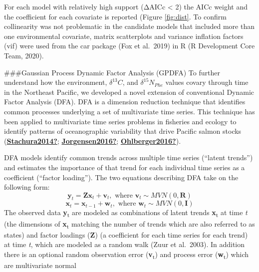 \documentclass [11pt, proquest] {uwthesis}[2015/03/03]
\begin{document}
For each model with relatively high support (ΔAICc \textless{} 2) the AICc weight and the coefficient for each covariate is reported (Figure \ref{fig:dist}. To confirm collinearity was not problematic in the candidate models that included more than one environmental covariate, matrix scatterplots and variance inflation factors (vif) were used from the car package (Fox et al.~2019) in R (R Development Core Team, 2020).

\#\#\#Gaussian Process Dynamic Factor Analysis (GPDFA)
To further understand how the environment, \(\delta^{13}C\), and \(\delta^{15}N_{Phe}\) values covary through time in the Northeast Pacific, we developed a novel extension of conventional Dynamic Factor Analysis (DFA). DFA is a dimension reduction technique that identifies common processes underlying a set of multivariate time series. This technique has been applied to multivariate time series problems in fisheries and ecology to identify patterns of oceanographic variability that drive Pacific salmon stocks (\protect\hyperlink{ref-Stachura2014}{\textbf{Stachura2014?}}; \protect\hyperlink{ref-Jorgensen2016}{\textbf{Jorgensen2016?}}; \protect\hyperlink{ref-Ohlberger2016}{\textbf{Ohlberger2016?}}).

DFA models identify common trends across multiple time series (``latent trends'') and estimates the importance of that trend for each individual time series as a coefficient (``factor loading''). The two equations describing DFA take on the following form:
\begin{equation} 
 \boldsymbol{y}_t = \boldsymbol{Zx}_t + \boldsymbol{v}_t,\mbox{ where }\boldsymbol{v}_t \sim MVN(0,\boldsymbol{R})
  \label{eq:gdfa1}
\end{equation}
\begin{equation} 
 \boldsymbol{x}_t = \boldsymbol{x}_{t-1} + \boldsymbol{w}_t,\mbox{ where }\boldsymbol{w}_t \sim MVN(0,\boldsymbol{I})
  \label{eq:gdfa2}
\end{equation}
The observed data \textbf{y}\textsubscript{t} are modeled as combinations of latent trends \textbf{x}\textsubscript{t} at time \emph{t} (the dimensions of \textbf{x}\textsubscript{t} matching the number of trends which are also referred to as states) and factor loadings (\textbf{Z}) (a coefficient for each time series for each trend) at time \emph{t}, which are modeled as a random walk (Zuur et al.~2003). In addition there is an optional random observation error (\textbf{v}\textsubscript{t}) and process error (\textbf{w}\textsubscript{t}) which are multivariate normal
\end{document}
